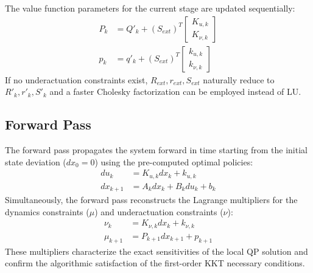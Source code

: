 \documentclass[11pt]{article}
\begin{document}
The value function parameters for the current stage are updated sequentially:
\begin{align}
    P_k &= Q'_k + (S_{ext})^T \begin{bmatrix} K_{u, k} \\ K_{\nu, k} \end{bmatrix} \\
    p_k &= q'_k + (S_{ext})^T \begin{bmatrix} k_{u, k} \\ k_{\nu, k} \end{bmatrix}
\end{align}
If no underactuation constraints exist, $R_{ext}, r_{ext}, S_{ext}$ naturally reduce to $R'_k, r'_k, S'_k$ and a faster Cholesky factorization can be employed instead of LU.

\subsection{Forward Pass}
The forward pass propagates the system forward in time starting from the initial state deviation ($dx_0 = 0$) using the pre-computed optimal policies:
\begin{align}
    du_k &= K_{u, k} dx_k + k_{u, k} \\
    dx_{k+1} &= A_k dx_k + B_k du_k + b_k
\end{align}
Simultaneously, the forward pass reconstructs the Lagrange multipliers for the dynamics constraints ($\mu$) and underactuation constraints ($\nu$):
\begin{align}
    \nu_k &= K_{\nu, k} dx_k + k_{\nu, k} \\
    \mu_{k+1} &= P_{k+1} dx_{k+1} + p_{k+1}
\end{align}
These multipliers characterize the exact sensitivities of the local QP solution and confirm the algorithmic satisfaction of the first-order KKT necessary conditions.
\end{document}
